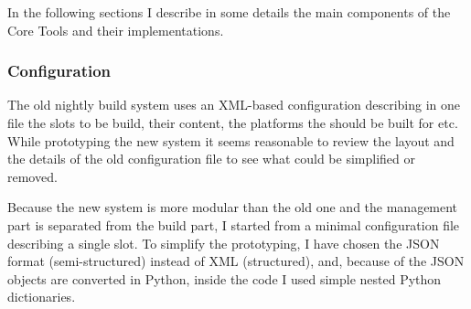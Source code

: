 \documentclass{lhcbnote}
\begin{document}
In the following sections I describe in some details the main components of the
Core Tools and their implementations.

\subsubsection{Configuration}
The old nightly build system uses an XML-based configuration describing in one
file the slots to be build, their content, the platforms the should be built for
etc.  While prototyping the new system it seems reasonable to review the layout
and the details of the old configuration file to see what could be simplified or
removed.

Because the new system is more modular than the old one and the management part
is separated from the build part, I started from a minimal configuration file
describing a single slot.  To simplify the prototyping, I have chosen the JSON
format (semi-structured) instead of XML (structured), and, because of the JSON
objects are converted in Python, inside the code I used simple nested Python
dictionaries.
\end{document}
